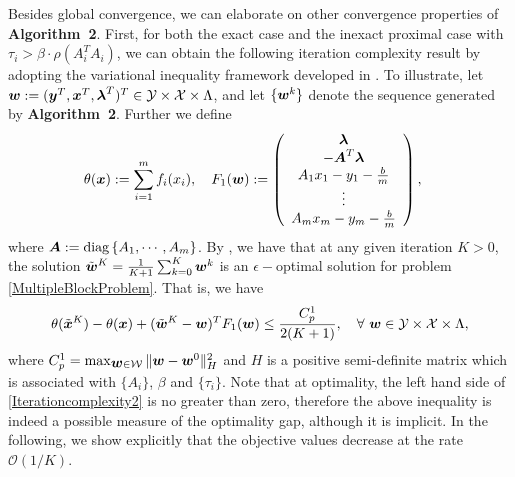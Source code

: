 \documentclass{mcom-l}
\theoremstyle{definition}
\theoremstyle{remark}
\numberwithin{equation}{section}
\begin{document}
Besides global convergence, we can elaborate on other convergence properties of {\bf Algorithm~2}. First, for both the exact case and the inexact proximal case with $\tau_i > \beta \cdot \rho (A_i^T A_i)$, we can obtain the following iteration complexity result by adopting the variational inequality framework developed in \cite[Theorem 4.1]{HeYuan2012}. To illustrate, let $\mbox{\boldmath$w$}:= (\mbox{\boldmath$y$}^T, \mbox{\boldmath$x$}^T,\mbox{\boldmath$\lambda$}^T )^T\in {\mathcal{Y}}\times {\mathcal{X}}\times\Lambda$, and let $\{\mbox{\boldmath$w$}^k\}$ denote the sequence generated by {\bf{Algorithm~2}}. Further we define
\begin{align}
\theta(\mbox{\boldmath$x$}) &:= \sum\limits_{i=1}^m f_i (x_i),\quad
F_1(\mbox{\boldmath$w$}) := \left(\begin{array}{c}
                            \mbox{\boldmath$\lambda$}\\
                            -\mbox{\boldmath$A$}^T\mbox{\boldmath$\lambda$}\\
                             A_1 x_1 - y_1 - \frac{b}{m}\\
        \vdots\\
        A_m x_m - y_m - \frac{b}{m}\\ \end{array}
                            \right),\nonumber
                            \end{align}
where $ \mbox{\boldmath$A$} := \hbox{diag}\left\{ A_1,\cdots,A_m \right\}$. By \cite[Theorem 4.1]{HeYuan2012}, we have that at any given iteration $K>0$,  the solution $\tilde{\mbox{\boldmath$w$}}^K=\frac{1}{K+1}\sum_{k=0}^{K}{{\mbox{\boldmath $w$}}}^k$ is an $\epsilon-$optimal solution for problem \eqref{MultipleBlockProblem}. That is, we have
\begin{equation}\label{Iterationcomplexity2}
\theta(\tilde{\mbox{\boldmath$x$}}^K) - \theta(\mbox{\boldmath$x$})
+ (\tilde{\mbox{\boldmath$w$}}^K - \mbox{\boldmath$w$})^T
F_1(\mbox{\boldmath$w$})\le \frac{C_p^1}{2(K+1)},\quad \forall\ \mbox{\boldmath$w$}\in
{\mathcal{Y}}\times{\mathcal{X}}\times\Lambda,
\end{equation}
where $C_p^1 = \max_{{{\mbox{\boldmath $w$}}}\in {\mathcal{W}}} \| \mbox{\boldmath$w$} - \mbox{\boldmath$w$}^0 \|_H^2$ and $H$ is a positive semi-definite matrix which is associated with $\{A_i\}$, $\beta$ and $\{\tau_i\}$. Note that at optimality, the left hand side of \eqref{Iterationcomplexity2} is no greater than zero, therefore the above inequality is indeed a possible measure of the
optimality gap, although it is implicit. In the following, we show explicitly that the objective values decrease at the rate ${\mathcal{O}}(1/K)$.
\end{document}
